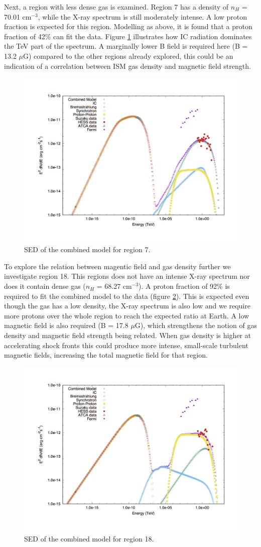 \documentclass[12pt,a4paper]{article}
\begin{document}
Next, a region with less dense gas is examined. Region 7 has a density of $n_H$ = 70.01 cm$^{-3}$, while the X-ray spectrum is still moderately intense. A low proton fraction is expected for this region. Modelling as above, it is found that a proton fraction of 42\% can fit the data. Figure \ref{fig:rxj1713comb7} illustrates how IC radiation dominates the TeV part of the spectrum. A marginally lower B field is required here (B = 13.2 $\mu$G) compared to the other regions already explored, this could be an indication of a correlation between ISM gas density and magnetic field strength.  
\begin{figure}[H]
	\centering
	\includegraphics[width=0.4\linewidth, height=0.3\textheight, angle=-90]{rxj1713_comb7}
	\caption{SED of the combined model for region 7.}
	\label{fig:rxj1713comb7}
\end{figure}
To explore the relation between magentic field and gas density further we investigate region 18. This regions does not have an intense X-ray spectrum nor does it contain dense gas ($n_H$ = 68.27 cm$^{-3}$). A proton fraction of 92\% is required to fit the combined model to the data (figure \ref{fig:rxj1713comb18}). This is expected even though the gas has a low density, the X-ray spectrum is also low and we require more protons over the whole region to reach the expected ratio at Earth. A low magnetic field is also required (B = 17.8 $\mu$G), which strengthens the notion of gas density and magnetic field strength being related. When gas density is higher at accelerating shock fronts this could produce more intense, small-scale turbulent magnetic fields, increasing the total magnetic field for that region. 
\begin{figure}[H]
	\centering
	\includegraphics[width=0.4\linewidth, height=0.3\textheight, angle=-90]{rxj1713_comb18}
	\caption{SED of the combined model for region 18.}
	\label{fig:rxj1713comb18}
\end{figure}
\end{document}
